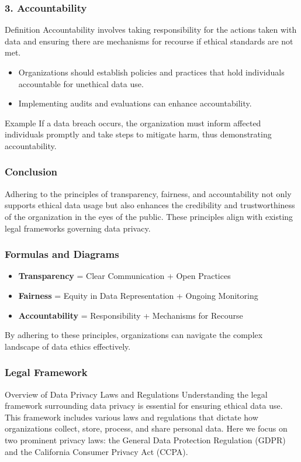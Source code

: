\documentclass[aspectratio=169]{beamer}
\begin{document}
\begin{frame}[fragile]
    \frametitle{3. Accountability}
    \begin{block}{Definition}
        Accountability involves taking responsibility for the actions taken with data and ensuring there are mechanisms for recourse if ethical standards are not met.
    \end{block}
    \begin{itemize}
        \item Organizations should establish policies and practices that hold individuals accountable for unethical data use.
        \item Implementing audits and evaluations can enhance accountability.
    \end{itemize}
    \begin{block}{Example}
        If a data breach occurs, the organization must inform affected individuals promptly and take steps to mitigate harm, thus demonstrating accountability.
    \end{block}
\end{frame}

\begin{frame}[fragile]
    \frametitle{Conclusion}
    Adhering to the principles of transparency, fairness, and accountability not only supports ethical data usage but also enhances the credibility and trustworthiness of the organization in the eyes of the public. These principles align with existing legal frameworks governing data privacy.
\end{frame}

\begin{frame}[fragile]
    \frametitle{Formulas and Diagrams}
    \begin{itemize}
        \item \textbf{Transparency} = Clear Communication + Open Practices
        \item \textbf{Fairness} = Equity in Data Representation + Ongoing Monitoring
        \item \textbf{Accountability} = Responsibility + Mechanisms for Recourse
    \end{itemize}
    By adhering to these principles, organizations can navigate the complex landscape of data ethics effectively.
\end{frame}

\begin{frame}[fragile]
  \frametitle{Legal Framework}
  \begin{block}{Overview of Data Privacy Laws and Regulations}
    Understanding the legal framework surrounding data privacy is essential for ensuring ethical data use. This framework includes various laws and regulations that dictate how organizations collect, store, process, and share personal data. Here we focus on two prominent privacy laws: 
    the General Data Protection Regulation (GDPR) and the California Consumer Privacy Act (CCPA).
  \end{block}
\end{frame}
\end{document}
